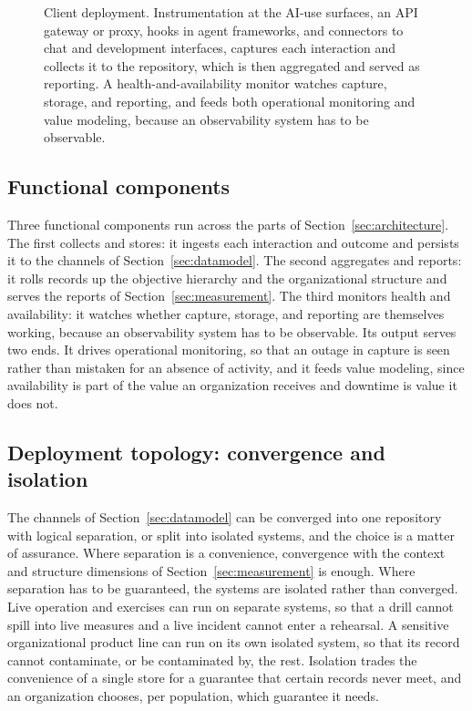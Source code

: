 \documentclass[11pt]{article}
\begin{document}
\begin{figure}[t]
\centering
\resizebox{\textwidth}{!}{}
\caption{Client deployment. Instrumentation at the AI-use surfaces, an API gateway
or proxy, hooks in agent frameworks, and connectors to chat and development
interfaces, captures each interaction and collects it to the repository, which is
then aggregated and served as reporting. A health-and-availability monitor watches
capture, storage, and reporting, and feeds both operational monitoring and value
modeling, because an observability system has to be observable.}
\label{fig:deployment}
\end{figure}

\subsection{Functional components}

Three functional components run across the parts of
Section~\ref{sec:architecture}. The first collects and stores: it ingests each
interaction and outcome and persists it to the channels of
Section~\ref{sec:datamodel}. The second aggregates and reports: it rolls records
up the objective hierarchy and the organizational structure and serves the reports
of Section~\ref{sec:measurement}. The third monitors health and availability: it
watches whether capture, storage, and reporting are themselves working, because an
observability system has to be observable. Its output serves two ends. It drives
operational monitoring, so that an outage in capture is seen rather than mistaken
for an absence of activity, and it feeds value modeling, since availability is
part of the value an organization receives and downtime is value it does not.

\subsection{Deployment topology: convergence and isolation}

The channels of Section~\ref{sec:datamodel} can be converged into one repository
with logical separation, or split into isolated systems, and the choice is a
matter of assurance. Where separation is a convenience, convergence with the
context and structure dimensions of Section~\ref{sec:measurement} is enough. Where
separation has to be guaranteed, the systems are isolated rather than converged.
Live operation and exercises can run on separate systems, so that a drill cannot
spill into live measures and a live incident cannot enter a rehearsal. A sensitive
organizational product line can run on its own isolated system, so that its record
cannot contaminate, or be contaminated by, the rest. Isolation trades the
convenience of a single store for a guarantee that certain records never meet, and
an organization chooses, per population, which guarantee it needs.
\end{document}
